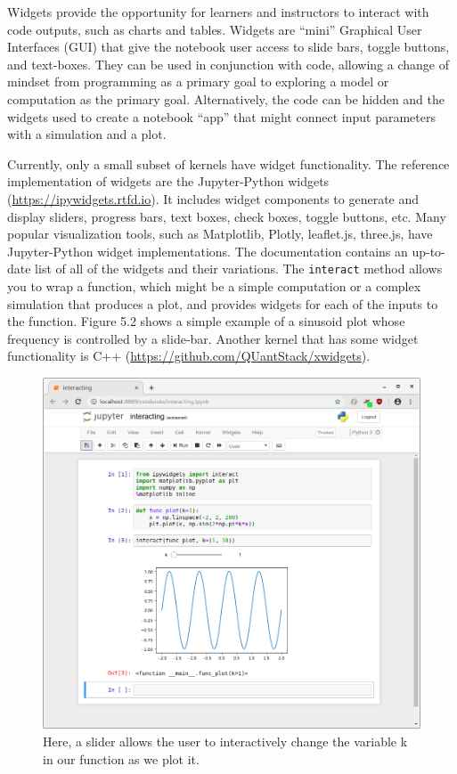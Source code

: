 \documentclass[]{book}
\begin{document}
Widgets provide the opportunity for learners and instructors to interact
with code outputs, such as charts and tables. Widgets are ``mini''
Graphical User Interfaces (GUI) that give the notebook user access to
slide bars, toggle buttons, and text-boxes. They can be used in
conjunction with code, allowing a change of mindset from programming as
a primary goal to exploring a model or computation as the primary goal.
Alternatively, the code can be hidden and the widgets used to create a
notebook ``app'' that might connect input parameters with a simulation
and a plot.

Currently, only a small subset of kernels have widget functionality. The
reference implementation of widgets are the Jupyter-Python widgets
(\url{https://ipywidgets.rtfd.io}). It includes widget components to
generate and display sliders, progress bars, text boxes, check boxes,
toggle buttons, etc. Many popular visualization tools, such as
Matplotlib, Plotly, leaflet.js, three.js, have Jupyter-Python widget
implementations. The documentation contains an up-to-date list of all of
the widgets and their variations. The \texttt{interact} method allows
you to wrap a function, which might be a simple computation or a complex
simulation that produces a plot, and provides widgets for each of the
inputs to the function. Figure 5.2 shows a simple example of a sinusoid
plot whose frequency is controlled by a slide-bar. Another kernel that
has some widget functionality is C++
(\url{https://github.com/QUantStack/xwidgets}).

\begin{figure}
\centering
\includegraphics{images/notebook-matplotlib-interact.png}
\caption{Here, a slider allows the user to interactively change the
variable k in our function as we plot it.}
\end{figure}
\end{document}
